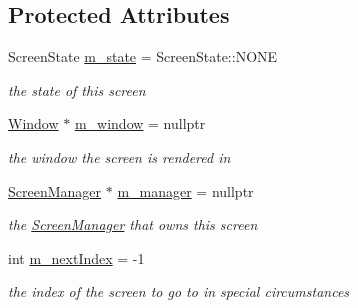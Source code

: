 \subsection*{Protected Attributes}
\begin{DoxyCompactItemize}
\item 
\mbox{\label{classnta_1_1Screen_a68d2c095aadfb248263f43cb12cd34a1}} 
Screen\+State \hyperlink{classnta_1_1Screen_a68d2c095aadfb248263f43cb12cd34a1}{m\+\_\+state} = Screen\+State\+::\+N\+O\+NE
\begin{DoxyCompactList}\small\item\em the state of this screen \end{DoxyCompactList}\item 
\mbox{\label{classnta_1_1Screen_a712bfbeb6f85d9c4229de9b974b05e58}} 
\hyperlink{classnta_1_1Window}{Window} $\ast$ \hyperlink{classnta_1_1Screen_a712bfbeb6f85d9c4229de9b974b05e58}{m\+\_\+window} = nullptr
\begin{DoxyCompactList}\small\item\em the window the screen is rendered in \end{DoxyCompactList}\item 
\mbox{\label{classnta_1_1Screen_a3496a69b02f4b120d907042d3201deff}} 
\hyperlink{classnta_1_1ScreenManager}{Screen\+Manager} $\ast$ \hyperlink{classnta_1_1Screen_a3496a69b02f4b120d907042d3201deff}{m\+\_\+manager} = nullptr
\begin{DoxyCompactList}\small\item\em the \hyperlink{classnta_1_1ScreenManager}{Screen\+Manager} that owns this screen \end{DoxyCompactList}\item 
\mbox{\label{classnta_1_1Screen_a6be3b899f3bc9e531d64676cbbd6815e}} 
int \hyperlink{classnta_1_1Screen_a6be3b899f3bc9e531d64676cbbd6815e}{m\+\_\+next\+Index} = -\/1
\begin{DoxyCompactList}\small\item\em the index of the screen to go to in special circumstances \end{DoxyCompactList}\end{DoxyCompactItemize}

